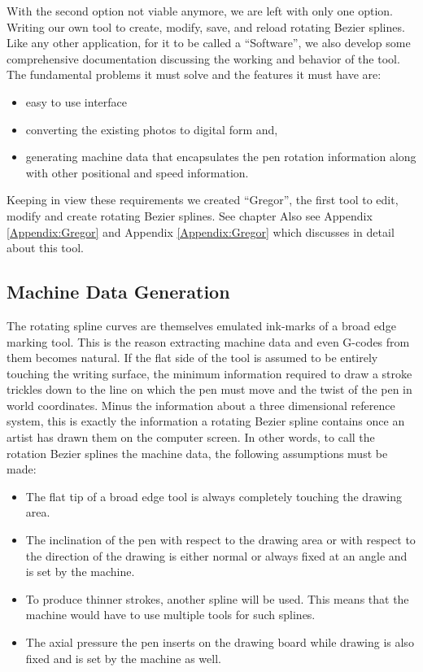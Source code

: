 With the second option not viable anymore, we are left with only one option. Writing our own tool to create, modify, save, and reload rotating Bezier splines. Like any other application, for it to be called a “Software”, we also develop some comprehensive documentation discussing the working and behavior of the tool. The fundamental problems it must solve and the features it must have are:

\begin{itemize}
\item easy to use interface
\item converting the existing photos to digital form and,
\item generating machine data that encapsulates the pen rotation information along with other positional and speed information.
\end{itemize}

Keeping in view these requirements we created ``Gregor'', the first tool to edit, modify and create rotating Bezier splines. See chapter Also see Appendix \ref{Appendix:Gregor} and Appendix \ref{Appendix:Gregor} which discusses in detail about this tool.

\subsection{Machine Data Generation}
\label{ExplorationPoints1}
The rotating spline curves are themselves emulated ink-marks of a broad edge marking tool. This is the reason extracting machine data and even G-codes from them becomes natural. If the flat side of the tool is assumed to be entirely touching the writing surface, the minimum information required to draw a stroke trickles down to the line on which the pen must move and the twist of the pen in world coordinates. Minus the information about a three dimensional reference system, this is exactly the information a rotating Bezier spline contains once an artist has drawn them on the computer screen. In other words, to call the rotation Bezier splines the machine data, the following assumptions must be made:
\begin{itemize}
	\item The flat tip of a broad edge tool is always completely touching the drawing area.
	\item The inclination of the pen with respect to the drawing area or with respect to the direction of the drawing is either normal or always fixed at an angle and is set by the machine.
	\item To produce thinner strokes, another spline will be used. This means that the machine would have to use multiple tools for such splines.
	\item The axial pressure the pen inserts on the drawing board while drawing is also fixed and is set by the machine as well.
\end{itemize}

